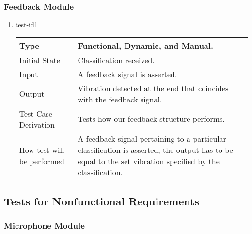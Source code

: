 \documentclass[12pt, titlepage]{article}
\begin{document}
\subsubsection{Feedback Module}

\begin{enumerate}

\item{test-id1\\}

\begin{tabular}{ |p{5cm}||p{7cm}| }
    \hline
    Type & Functional, Dynamic, and Manual. \\
    \hline
    Initial State  &  Classification received. \\
    \hline
    Input &   A feedback signal is asserted.  \\
    \hline
    Output &   Vibration detected at the end that coincides with the feedback signal.  \\
    \hline
    Test Case Derivation &   Tests how our feedback structure performs. \\
    \hline
    How test will be performed & A feedback signal pertaining to a particular classification is asserted, the output has to be equal to the set vibration specified by the classification. \\
    \hline
\end{tabular}

\end{enumerate}

\subsection{Tests for Nonfunctional Requirements}



\subsubsection{Microphone Module}
\end{document}
